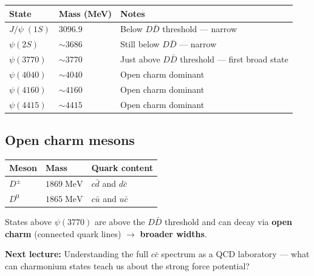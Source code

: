 \documentclass[11pt,a4paper]{article}
\newenvironment{notebox}{%
  \par\vspace{4pt}
  \noindent\small\color{notegray}%
}{\par\vspace{4pt}}
\newcommand{\keyword}[1]{\textbf{#1}}
\begin{document}
\vspace{6pt}
\begin{center}
\begin{tabular}{C{2.8cm} C{2.8cm} L{6cm}}
  \toprule
  \color{white}\textbf{State} &
  \color{white}\textbf{Mass (MeV)} &
  \color{white}\textbf{Notes} \\
  \midrule
  $J/\psi\;(1S)$ & $3096.9$ & Below $D\bar{D}$ threshold --- narrow \\
  $\psi(2S)$     & $\sim 3686$ & Still below $D\bar{D}$ --- narrow \\
  $\psi(3770)$   & $\sim 3770$ & Just above $D\bar{D}$ threshold --- first broad state \\
  $\psi(4040)$   & $\sim 4040$ & Open charm dominant \\
  $\psi(4160)$   & $\sim 4160$ & Open charm dominant \\
  $\psi(4415)$   & $\sim 4415$ & Open charm dominant \\
  \bottomrule
\end{tabular}
\end{center}
\vspace{6pt}

\subsection{Open charm mesons}

\vspace{4pt}
\begin{center}
\begin{tabular}{C{2cm} C{3cm} C{5cm}}
  \toprule
  \color{white}\textbf{Meson} &
  \color{white}\textbf{Mass} &
  \color{white}\textbf{Quark content} \\
  \midrule
  $D^\pm$ & $1869\;\mathrm{MeV}$ & $c\bar{d}$ and $d\bar{c}$ \\
  $D^0$   & $1865\;\mathrm{MeV}$ & $c\bar{u}$ and $u\bar{c}$ \\
  \bottomrule
\end{tabular}
\end{center}
\vspace{6pt}

States above $\psi(3770)$ are above the $D\bar{D}$ threshold and can decay via
\keyword{open charm} (connected quark lines) $\to$ \textbf{broader widths}.

\begin{notebox}
  \textbf{Next lecture:} Understanding the full $c\bar{c}$ spectrum as a QCD laboratory
  --- what can charmonium states teach us about the strong force potential?
\end{notebox}
\end{document}
